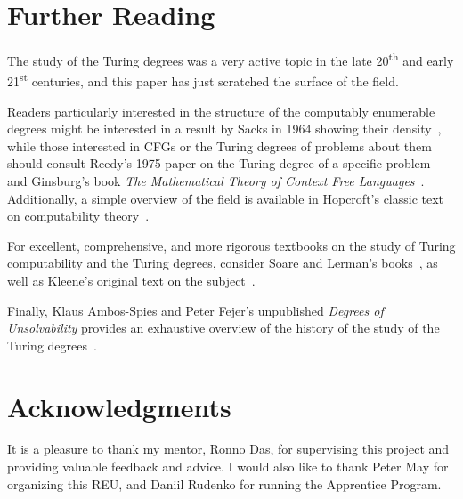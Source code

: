 \documentclass[psamsfonts]{amsart}
\newtheorem{thm}{Theorem}[section]
\theoremstyle{definition}
\theoremstyle{remark}
\numberwithin{equation}{section}
\begin{document}
\section{Further Reading}
The study of the Turing degrees was a very active topic in the late
20\textsuperscript{th} and early 21\textsuperscript{st} centuries, and this
paper has just scratched the surface of the field. \par
Readers particularly interested in the structure of the computably enumerable
degrees might be interested in a result by Sacks in 1964 showing their
density~\cite{sacks64:_recur_enumer_degrees_dense}, while those interested in
\aclp{CFG} or the Turing degrees of problems about them should consult Reedy's
1975 paper on the Turing degree of a specific problem~\cite{REEDY197577} and
Ginsburg's book \emph{The Mathematical Theory of Context Free
  Languages}~\cite{ginsburg66:_mathem_theor_contex_languag}. Additionally, a
simple overview of the field is available in Hopcroft's classic text on
computability
theory~\cite[chs.~5--7]{hopcroft07:_introd_autom_theor_languag_comput}. \par For excellent, comprehensive,
and more rigorous textbooks on the study of Turing computability and the Turing
degrees, consider Soare and Lerman's
books~\cite{soare16_turin_comput,lerman16:_degrees_unsol}, as well as
Kleene's original text on the subject~\cite{kleene80_introd}. \par
Finally, Klaus Ambos-Spies and Peter Fejer's unpublished \emph{Degrees
  of Unsolvability} provides an exhaustive overview of the history of the study
of the Turing degrees~\cite{ambos-spies06:_degrees_unsol}.










\section*{Acknowledgments}
It is a pleasure to thank my mentor, Ronno Das, for supervising this project and
providing valuable feedback and advice. I would also like to thank Peter May for
organizing this REU, and Daniil Rudenko for running the Apprentice Program.

\printbibliography
\end{document}
